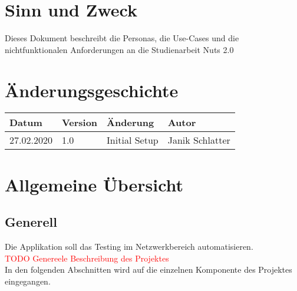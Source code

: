 \documentclass[
	ngerman,
	toc=listof, %
	toc=bibliography, %
	footnotes=multiple, %
	parskip=half, %
	numbers=noendperiod %
]{scrartcl}
\newcommand{\vorlagenOrdner}{../../99_Vorlagen} %
\begin{document}
\thispagestyle{plain}

\cleardoublepage


\section{Sinn und Zweck}
Dieses Dokument beschreibt die Personas, die Use-Cases und die nichtfunktionalen Anforderungen an die Studienarbeit Nuts 2.0
\section*{Änderungsgeschichte}
\begin{tabularx}{\textwidth}{llXl}
	\toprule
	Datum & Version & Änderung & Autor \\
	\midrule
	27.02.2020 & 1.0 & Initial Setup & Janik Schlatter \\
	\bottomrule
\end{tabularx}
\cleardoublepage

{}
\tableofcontents
\cleardoublepage

\let\stdsection\section
\renewcommand\section{\clearpage\stdsection}

\section{Allgemeine Übersicht}
	\subsection{Generell}
		Die Applikation soll das Testing im Netzwerkbereich automatisieren. \\
		\textcolor{red}{TODO Genereele Beschreibung des Projektes} \\
		In den folgenden Abschnitten wird auf die einzelnen Komponente des Projektes eingegangen.
	
\end{document}
